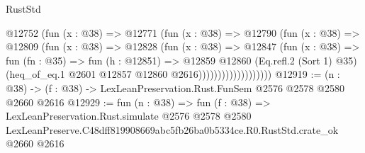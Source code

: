 \begin{lexlean}{RustStd}
\begin{coremodule}
                          @12752
                            (fun (x : @38) =>
                            @12771
                              (fun (x : @38) =>
                              @12790
                                (fun (x : @38) =>
                                @12809
                                  (fun (x : @38) =>
                                  @12828
                                    (fun (x : @38) =>
                                    @12847
                                      (fun (x : @38) =>
                                      fun (fn : @35) =>
                                      fun (h : @12851) =>
                                      @12859
                                        @12860
                                        (Eq.refl.{2} (Sort 1) @35)
                                        (heq_of_eq.{1} @2601 @12857 @12860 @2616)))))))))))))))))))
@12919 := (n : @38) -> (f : @38) -> LexLeanPreservation.Rust.FunSem @2576 @2578 @2580 @2660 @2616
@12929 := fun (n : @38) =>
  fun (f : @38) =>
  LexLeanPreservation.Rust.simulate
    @2576
    @2578
    @2580
    LexLeanPreserve.C48dff819908669abc5fb26ba0b5334ce.R0.RustStd.crate_ok
    @2660
    @2616
\end{coremodule}
\end{lexlean}
